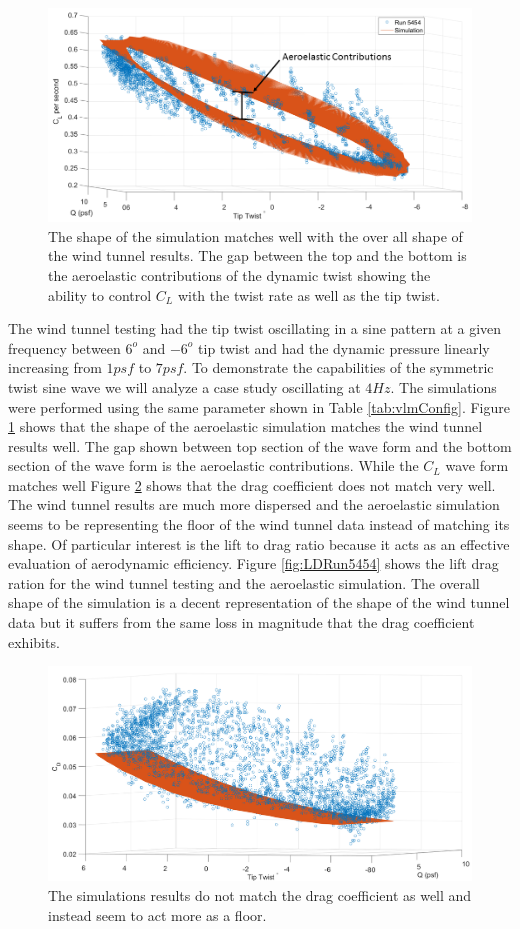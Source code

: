\documentclass[11pt]{ucthesis}
\begin{document}
\begin{figure}[thpb]
\centering
\includegraphics[width=.75\linewidth]{Figures/Run5454CLAeroelastic.png}
\caption{The shape of the simulation matches well with the over all shape of the wind tunnel results. The gap between the top and the bottom is the aeroelastic contributions of the dynamic twist showing the ability to control $C_L$ with the twist rate as well as the tip twist.}
\label{fig:CLRun5454}
\end{figure}

The wind tunnel testing had the tip twist oscillating in a sine pattern at a given frequency between $6^o$ and $-6^o$ tip twist and had the dynamic pressure linearly increasing from $1 psf$ to $7 psf$. To demonstrate the capabilities of the symmetric twist sine wave we will analyze a case study oscillating at $4 Hz$. The simulations were performed using the same parameter shown in Table \ref{tab:vlmConfig}. Figure \ref{fig:CLRun5454} shows that the shape of the aeroelastic simulation matches the wind tunnel results well. The gap shown between top section of the wave form and the bottom section of the wave form is the aeroelastic contributions. While the $C_L$ wave form matches well Figure \ref{fig:CDRun5454}  shows that the drag coefficient does not match very well. The wind tunnel results are much more dispersed and the aeroelastic simulation seems to be representing the floor of the wind tunnel data instead of matching its shape. Of particular interest is the lift to drag ratio because it acts as an effective evaluation of aerodynamic efficiency. Figure \ref{fig:LDRun5454} shows the lift drag ration for the wind tunnel testing and the aeroelastic simulation. The overall shape of the simulation is a decent representation of the shape of the wind tunnel data but it suffers from the same loss in magnitude that the drag coefficient exhibits.

\begin{figure}[thpb]
\centering
\includegraphics[width=.75\linewidth]{Figures/CD5454.png}
\caption{The simulations results do not match the drag coefficient as well and instead seem to act more as a floor.}
\label{fig:CDRun5454}
\end{figure}
\end{document}
